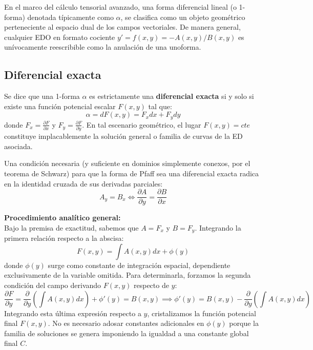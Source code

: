 En el marco del cálculo tensorial avanzado, una forma diferencial lineal (o 1-forma) denotada típicamente como $\alpha$, se clasifica como un objeto geométrico perteneciente al espacio dual de los campos vectoriales. De manera general, cualquier EDO en formato cociente $y' = f(x,y) = -A(x,y)/B(x,y)$ es unívocamente reescribible como la anulación de una unoforma.

\subsection{Diferencial exacta}

\begin{definicion}
Se dice que una 1-forma $\alpha$ es estrictamente una \textbf{diferencial exacta} si y solo si existe una función potencial escalar $F(x,y)$ tal que:
$$ \alpha = dF(x,y) = F_x dx + F_y dy $$
donde $F_x = \frac{\partial F}{\partial x}$ y $F_y = \frac{\partial F}{\partial y}$. En tal escenario geométrico, el lugar $F(x,y) = cte$ constituye implacablemente la solución general o familia de curvas de la ED asociada.
\end{definicion}

\begin{teorema}
Una condición necesaria (y suficiente en dominios simplemente conexos, por el teorema de Schwarz) para que la forma de Pfaff sea una diferencial exacta radica en la identidad cruzada de sus derivadas parciales:
$$ A_y = B_x \iff \frac{\partial A}{\partial y} = \frac{\partial B}{\partial x} $$
\end{teorema}

\textbf{Procedimiento analítico general:} \\
Bajo la premisa de exactitud, sabemos que $A = F_x$ y $B = F_y$. 
Integrando la primera relación respecto a la abscisa:
$$ F(x,y) = \int A(x,y)dx + \phi(y) $$
donde $\phi(y)$ surge como constante de integración espacial, dependiente exclusivamente de la variable omitida. Para determinarla, forzamos la segunda condición del campo derivando $F(x,y)$ respecto de $y$:
$$ \frac{\partial F}{\partial y} = \frac{\partial}{\partial y} \left( \int A(x,y)dx \right) + \phi'(y) = B(x,y) \implies \phi'(y) = B(x,y) - \frac{\partial}{\partial y} \left( \int A(x,y)dx \right) $$
Integrando esta última expresión respecto a $y$, cristalizamos la función potencial final $F(x,y)$. No es necesario adosar constantes adicionales en $\phi(y)$ porque la familia de soluciones se genera imponiendo la igualdad a una constante global final $C$.

